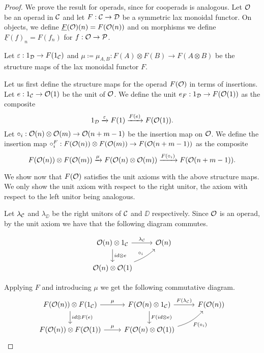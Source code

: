 \documentclass[Thesis.tex]{subfiles}
\begin{document}
\begin{proof}
We prove the result for operads, since for cooperads is analogous. Let ${\mathcal O}$ be an operad in ${\mathcal C}$ and let $F:{\mathcal C}\to{\mathcal D}$ be a symmetric lax monoidal functor. On objects, we define $\underline{F}({\mathcal O})(n)= F({\mathcal O}(n))$ and on morphisms we define $\underline{F}(f)_n=F(f_n)$ for $f:{\mathcal O}\to\mathcal{P}$. 

Let $\varepsilon: 1_{\mathcal D}\to F(1_{\mathcal C})$ and $\mu\coloneqq\mu_{A,B}: F(A)\otimes F(B)\to F(A\otimes B)$ be the structure maps of the lax monoidal functor $F$. 

Let us first define the structure maps for the operad $F({\mathcal O})$ in terms of insertions. Let $e:1_{\mathcal C}\to{\mathcal O}(1)$ be the unit of ${\mathcal O}$. We define the unit $e_F:1_{\mathcal D}\to F({\mathcal O}(1))$ as the composite
\[1_{\mathcal D}\xrightarrow{\varepsilon} F(1)\xrightarrow{F(e)} F({\mathcal O}(1)).\]
Let $\circ_i :{\mathcal O}(n)\otimes{\mathcal O}(m)\to{\mathcal O}(n+m-1)$ be the insertion map on ${\mathcal O}$. We define the insertion map $\circ_i^F:F({\mathcal O}(n))\otimes F({\mathcal O}(m))\to F({\mathcal O}(n+m-1))$ as the composite
\[F({\mathcal O}(n))\otimes F({\mathcal O}(m))\xrightarrow{\mu} F({\mathcal O}(n)\otimes{\mathcal O}(m))\xrightarrow{F(\circ_i)} F({\mathcal O}(n+m-1)).\]

We show now that $F({\mathcal O})$ satisfies the unit axioms with the above structure maps. We only show the unit axiom with respect to the right unitor, the axiom with respect to the left unitor being analogous.


 Let $\lambda_{\mathcal C}$ and $\lambda_\DD$ be the right unitors of ${\mathcal C}$ and $\DD$ respectively. Since ${\mathcal O}$ is an operad, by the unit axiom we have that the following diagram commutes.
 
  \[
 \begin{tikzcd}
 \OO(n)\otimes 1_\CC\arrow[r, "\lambda_\CC"]\arrow[d, "id\otimes e"] &  \OO(n) \\
 \OO(n)\otimes \OO(1)\arrow[ur, bend right = 10, "\circ_i"]&
 \end{tikzcd}
 \]
 
Applying $F$ and introducing $\mu$ we get the following commutative diagram.
\begin{equation}\label{unitaux}
\begin{tikzcd}
F(\OO(n))\otimes F(1_\CC)\arrow[r,"\mu"]\arrow[d, "id\otimes F(e)"] & F(\OO(n)\otimes 1_\CC)\arrow[r, "F(\lambda_\CC)"]\arrow[d, "F(id\otimes e)"]&
F(\OO(n))\\
F(\OO(n))\otimes F(\OO(1))\arrow[r,"\mu"] & F(\OO(n)\otimes \OO(1))\arrow[ur, bend right = 15, "F(\circ_i)"']
\end{tikzcd}
\end{equation}


\end{proof}
\end{document}

